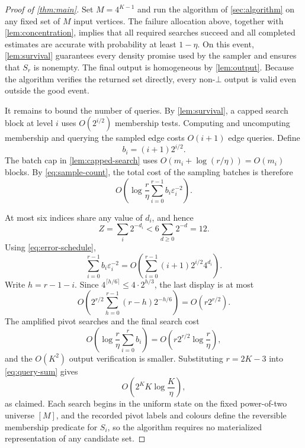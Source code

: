 \begin{proof}[Proof of \cref{thm:main}]
Set $M=4^{K-1}$ and run the algorithm of \cref{sec:algorithm} on any fixed
set of $M$ input vertices.  The failure allocation above, together with
\cref{lem:concentration}, implies that all required searches succeed and all
completed estimates are accurate with probability at least $1-\eta$.  On
this event, \cref{lem:survival} guarantees every density promise used by the
sampler and ensures that $S_r$ is nonempty.  The final output is homogeneous
by \cref{lem:output}.  Because the algorithm verifies the returned set
directly, every non-$\bot$ output is valid even outside the good event.

It remains to bound the number of queries.  By \cref{lem:survival}, a capped
search block at level $i$ uses $O(2^{i/2})$ membership tests.  Computing and
uncomputing membership and querying the sampled edge costs $O(i+1)$ edge
queries.  Define
\[
 b_i=(i+1)2^{i/2}.
\]
The batch cap in \cref{lem:capped-search} uses
$O(m_i+\log(r/\eta))=O(m_i)$ blocks.  By \cref{eq:sample-count}, the total
cost of the sampling batches is therefore
\begin{equation}\label{eq:query-sum}
 O\!\left(
 \log\frac r\eta
 \sum_{i=0}^{r-1}b_i\varepsilon_i^{-2}
 \right).
\end{equation}

At most six indices share any value of $d_i$, and hence
\[
 Z=\sum_i2^{-d_i}<6\sum_{d\ge0}2^{-d}=12.
\]
Using \cref{eq:error-schedule},
\[
 \sum_{i=0}^{r-1}b_i\varepsilon_i^{-2}
 =O\!\left(
 \sum_{i=0}^{r-1}(i+1)2^{i/2}4^{d_i}
 \right).
\]
Write $h=r-1-i$.  Since
$4^{\lceil h/6\rceil}\le4\cdot2^{h/3}$, the last display is at most
\[
 O\!\left(
 2^{r/2}\sum_{h=0}^{r-1}(r-h)2^{-h/6}
 \right)
 =O(r2^{r/2}).
\]
The amplified pivot searches and the final search cost
\[
 O\!\left(\log\frac r\eta\sum_{i=0}^{r}b_i\right)
 =O\!\left(r2^{r/2}\log\frac r\eta\right),
\]
and the $O(K^2)$ output verification is smaller.  Substituting $r=2K-3$
into \cref{eq:query-sum} gives
\[
 O\!\left(2^K K\log\frac K\eta\right),
\]
as claimed.  Each search begins in the uniform state on the fixed
power-of-two universe $[M]$, and the recorded pivot labels and colours define
the reversible membership predicate for $S_i$, so the algorithm requires no
materialized representation of any candidate set.
\end{proof}
